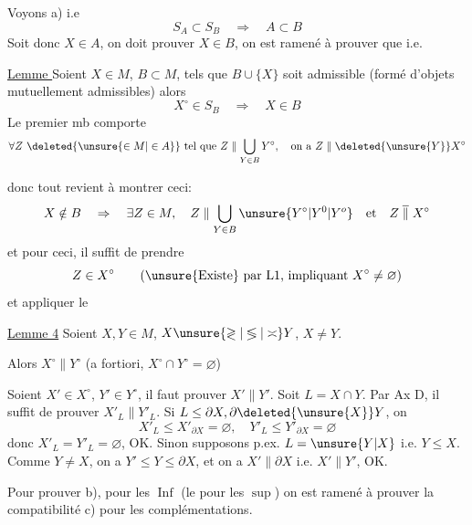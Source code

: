 Voyons a) i.e
\[
S_A\subset S_B\quad\Rightarrow\quad A\subset B
\]
Soit donc $X\in A$, on doit prouver $X\in B$, on est ramené à prouver que
i.e.

\uline{Lemme } Soient $X\in M$, $B\subset M$, tels que $B\cup\{X\}$ soit admissible (formé d'objets mutuellement admissibles) alors
\[
X^\circ\in S_B\quad\Rightarrow\quad X\in B
\]
Le premier mb  comporte
\[
\forall Z\ \deleted{\unsure{\in M|\in A}}\text{ tel que }Z\parallel\bigcup_{Y\in B}Y^\circ,\quad\text{on a }Z\parallel\deleted{\unsure{Y}}X^\circ
\]

donc tout revient à montrer ceci:
\[
X\notin B\quad\Rightarrow\quad\exists Z\in M,\quad Z\parallel\bigcup_{Y\in B}\unsure{Y^\circ|Y^0|Y^o}\quad\text{et}\quad Z\mathrel{\overline{\parallel}}X^\circ
\]
et pour ceci, il suffit de prendre
\[
Z\in X^\circ\qquad\text{(\unsure{Existe} par L1, impliquant }X^\circ\ne\varnothing\text{)}
\]
et appliquer le

\margin{$\big\vert\!\big\vert\!\big\vert$}
\uline{Lemme 4} Soient $X,Y\in M$, $X\unsure{\gtrless|\lessgtr|\asymp}Y$, $X\ne Y$.

Alors $X^\circ\parallel Y^\circ$ (a fortiori, $X^\circ\cap Y^\circ=\varnothing$)

Soient $X'\in X^\circ$, $Y'\in Y^\circ$, il faut prouver $X'\parallel Y'$.
Soit $L=X\cap Y$. Par Ax D, il suffit de prouver $X'_L\parallel Y'_L$. Si $L\leq\partial X,\partial\deleted{\unsure{X}}Y$,   on 
\[
X'_L\leq X'_{\partial X}=\varnothing,\quad Y'_L\leq Y'_{\partial X}=\varnothing
\]
donc $X'_L=Y'_L=\varnothing$, OK. Sinon  supposons p.ex. $L=\unsure{Y|X}$ i.e. $Y\leq X$. Comme $Y\ne X$, on a $Y'\leq Y\leq\partial X$, et on a $X'\parallel\partial X$ i.e. $X'\parallel Y'$, OK.

Pour prouver b),  pour les $\operatorname{Inf}$ (le  pour les $\operatorname{sup}$) on est ramené à prouver la  compatibilité c) pour les complémentations. 

